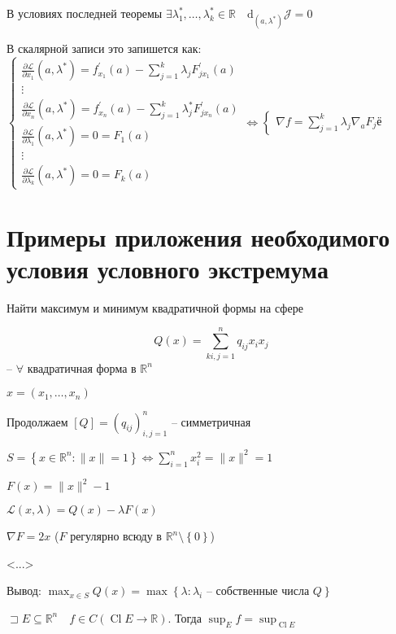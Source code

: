 \documentclass{book}
\newcommand\R{\ensuremath{\mathbb{R}}}
\newcommand{\p}[1]{#1^{\prime}}
\theoremstyle{definition}
\DeclareMathOperator{\Cl}{Cl}
\begin{document}
\begin{theorem}

    В условиях последней теоремы $\exists \lambda_1^*, \ldots, \lambda_k^*\in \R\quad \mathrm d_{\left( a, \lambda^* \right) } \mathcal J = 0$

    В скалярной записи это запишется как:
    $\begin{cases}
        \frac{\partial \mathcal L}{\partial x_1}\left( a, \lambda^* \right)  = \p f_{x_1}(a) - \sum_{j=1}^{k} \lambda_j \p F_{jx_1}(a)\\
        \vdots\\
        \frac{\partial \mathcal L}{\partial x_n}\left( a, \lambda^* \right)  = \p f_{x_{n}}(a) - \sum_{j=1}^{k} \lambda_j^*\p F_{jx_{n} }(a)\\ \hline
        \frac{\partial \mathcal L}{\partial \lambda_1}\left( a, \lambda^* \right) = 0 = F_1(a)\\
        \vdots\\
        \frac{\partial \mathcal L}{\partial \lambda_k}\left( a, \lambda^* \right) = 0 =F_k(a)
    \end{cases} \iff  \begin{cases}
        \nabla f = \sum_{j=1}^{k} \lambda_j \nabla _aF_jё
    \end{cases}$
\end{theorem}

\section{Примеры приложения необходимого условия условного экстремума}

\begin{problem}
    Найти максимум и минимум квадратичной формы на сфере

    \[Q(x) = \sum_{ki,j=1}^{n} q_{ij}x_ix_j\] -- $\forall $ квадратичная форма в $\R^n$

    $x = \left( x_1, \ldots, x_{n}  \right) $

    Продолжаем $[Q] = \left( q_{ij} \right) ^n_{i,j=1}$ -- симметричная

    $S = \left\{ x\in \R^n:\|x\| = 1 \right\} \iff \sum_{i=1}^{n} x_i^2 = \|x\|^2 = 1 $ 

    $F(x) = \|x\|^2-1$

    $\mathcal L(x, \lambda) = Q(x) - \lambda F(x)$

    $\nabla F = 2x$ ($F$ регулярно всюду в  $\R^n\setminus \left\{ 0 \right\} $)

    <...>

    Вывод: $\max_{x\in S}Q(x) = \max \left\{ \lambda: \lambda_i \text{ -- собственные числа } Q \right\} $ 


\end{problem}
$\sqsupset E\subseteq \R^n \quad f\in C\left( \Cl E \to  \R \right)  $. Тогда $\sup_E f = \sup _{\Cl E}$
\end{document}
